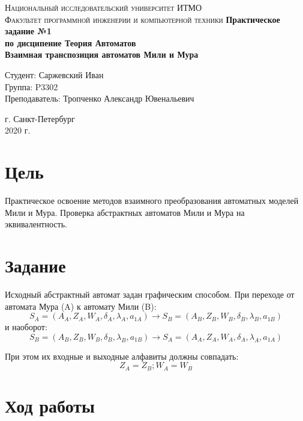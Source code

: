 \documentclass[12pt, a4paper]{article}
\begin{document}
\begin{titlepage}
\begin{center}

\textsc{Национальный исследовательский университет ИТМО\\[4mm]
Факультет программной инженерии и компьютерной техники}
\vfill
\textbf{Практическое задание №1\\[4mm]
по дисципение Теория Автоматов\\[4mm]
Взаимная транспозиция автоматов Мили и Мура\\[16mm]
}
\begin{flushright}
Студент: Саржевский Иван
\\[2mm]Группа: P3302
\\[2mm]Преподаватель: Тропченко Александр Ювенальевич
\end{flushright}
\vfill
г. Санкт-Петербург\\[2mm]
2020 г.

\end{center}
\end{titlepage}

\section*{Цель}

Практическое освоение методов взаимного преобразования автоматных моделей
Мили и Мура. Проверка абстрактных автоматов Мили и Мура на эквивалентность.

\section*{Задание}

Исходный абстрактный автомат задан графическим способом. При переходе от
автомата Мура (A) к автомату Мили (B):
$$S_A = (A_A, Z_A, W_A, \delta_A, \lambda_A, a_{1A}) \to S_B = (A_B, Z_B, W_B, \delta_B, \lambda_B, a_{1B})$$
и наоборот:
$$S_B = (A_B, Z_B, W_B, \delta_B, \lambda_B, a_{1B}) \to S_A = (A_A, Z_A, W_A, \delta_A, \lambda_A, a_{1A})$$

При этом их входные и выходные алфавиты должны совпадать:
$$Z_A = Z_B; W_A = W_B$$

\section*{Ход работы}
\end{document}
